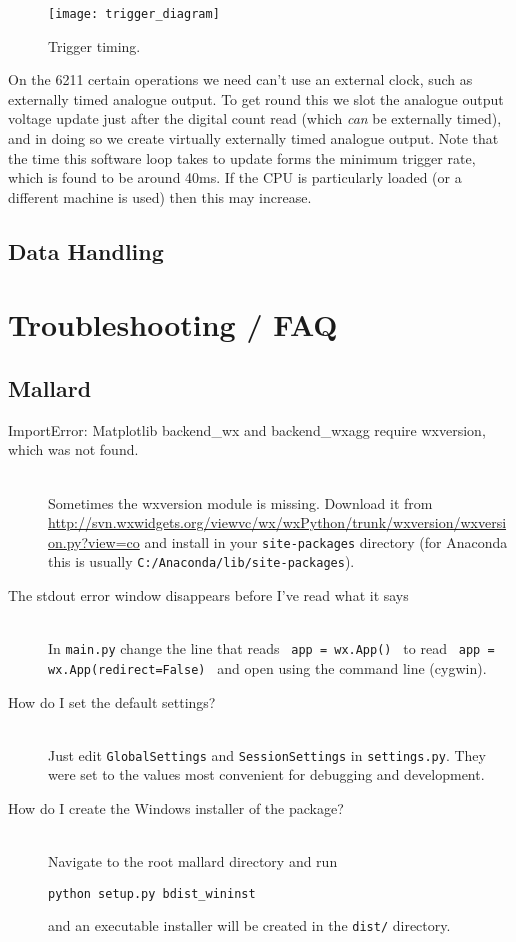 \documentclass[10pt,a4paper]{article}
\begin{document}
\begin{figure}[h!]

  \centering
    \texttt{[image: trigger\_diagram]}
      \caption{Trigger timing.}
\end{figure}

On the 6211 certain operations we need can't use an external clock, such as externally timed analogue output. To get round this we slot the analogue output voltage update just after the digital count read (which \textit{can} be externally timed), and in doing so we create virtually externally timed analogue output. Note that the time this software loop takes to update forms the minimum trigger rate, which is found to be around 40ms. If the CPU is particularly loaded (or a different machine is used) then this may increase.

\subsection{Data Handling}

\section{Troubleshooting / FAQ}
\subsection{Mallard}
\begin{description}
  \item[ImportError: Matplotlib backend\_wx and backend\_wxagg require wxversion, which was not found.] \hfill \\
  Sometimes the wxversion module is missing. Download it from \url{http://svn.wxwidgets.org/viewvc/wx/wxPython/trunk/wxversion/wxversion.py?view=co} and install in your \texttt{site-packages} directory (for Anaconda this is usually \texttt{C:/Anaconda/lib/site-packages}).
  \item[The stdout error window disappears before I've read what it says] \hfill \\
  In \texttt{main.py} change the line that reads \texttt{ app = wx.App() } to read \texttt{ app = wx.App(redirect=False) } and open using the command line (cygwin).
   \item[How do I set the default settings?] \hfill \\
	Just edit \texttt{GlobalSettings} and \texttt{SessionSettings} in \texttt{settings.py}. They were set to the values most convenient for debugging and development.
	\item[How do I create the Windows installer of the package?] \hfill \\
Navigate to the root mallard directory and run
\begin{verbatim}
python setup.py bdist_wininst
\end{verbatim}
and an executable installer will be created in the \texttt{dist/} directory.
\end{description}
\end{document}
